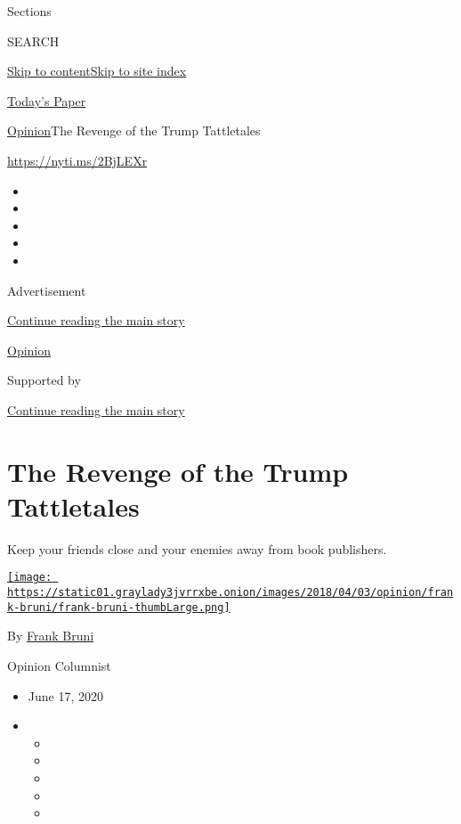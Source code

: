 Sections

SEARCH

\protect\hyperlink{site-content}{Skip to
content}\protect\hyperlink{site-index}{Skip to site index}

\href{https://myaccount.nytimes3xbfgragh.onion/auth/login?response_type=cookie\&client_id=vi}{}

\href{https://www.nytimes3xbfgragh.onion/section/todayspaper}{Today's
Paper}

\href{/section/opinion}{Opinion}\textbar{}The Revenge of the Trump
Tattletales

\href{https://nyti.ms/2BjLEXr}{https://nyti.ms/2BjLEXr}

\begin{itemize}
\item
\item
\item
\item
\item
\end{itemize}

Advertisement

\protect\hyperlink{after-top}{Continue reading the main story}

\href{/section/opinion}{Opinion}

Supported by

\protect\hyperlink{after-sponsor}{Continue reading the main story}

\hypertarget{the-revenge-of-the-trump-tattletales}{%
\section{The Revenge of the Trump
Tattletales}\label{the-revenge-of-the-trump-tattletales}}

Keep your friends close and your enemies away from book publishers.

\href{https://www.nytimes3xbfgragh.onion/by/frank-bruni}{\texttt{[image: https://static01.graylady3jvrrxbe.onion/images/2018/04/03/opinion/frank-bruni/frank-bruni-thumbLarge.png]}}

By \href{https://www.nytimes3xbfgragh.onion/by/frank-bruni}{Frank Bruni}

Opinion Columnist

\begin{itemize}
\item
  June 17, 2020
\item
  \begin{itemize}
  \item
  \item
  \item
  \item
  \item
  \end{itemize}
\end{itemize}

